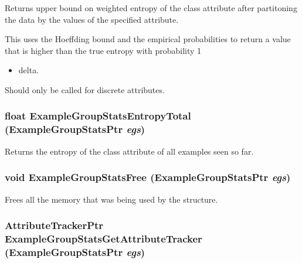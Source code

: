 Returns upper bound on weighted entropy of the class attribute after partitoning the data by the values of the specified attribute. 

This uses the Hoeffding bound and the empirical probabilities to return a value that is higher than the true entropy with probability 1\begin{itemize}
\item delta.\end{itemize}


Should only be called for discrete attributes. 
\subsubsection{\setlength{\rightskip}{0pt plus 5cm}float Example\-Group\-Stats\-Entropy\-Total ({\bf Example\-Group\-Stats\-Ptr} {\em egs})}\label{ExampleGroupStats_8h_a42}


Returns the entropy of the class attribute of all examples seen so far. 

\subsubsection{\setlength{\rightskip}{0pt plus 5cm}void Example\-Group\-Stats\-Free ({\bf Example\-Group\-Stats\-Ptr} {\em egs})}\label{ExampleGroupStats_8h_a21}


Frees all the memory that was being used by the structure. 

\subsubsection{\setlength{\rightskip}{0pt plus 5cm}Attribute\-Tracker\-Ptr Example\-Group\-Stats\-Get\-Attribute\-Tracker ({\bf Example\-Group\-Stats\-Ptr} {\em egs})}\label{ExampleGroupStats_8h_a27}


